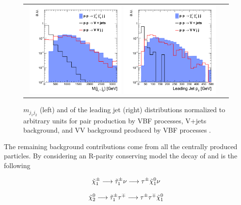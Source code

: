 \begin{figure}[tbh!]
	\centering
	\begin{tabular}{cc}
		\includegraphics[width=0.48\textwidth]{analysis/pics/VBFDiJetMass.png}
		\includegraphics[width=0.48\textwidth]{analysis/pics/VBFFirstLeadingJetPt.png} 		
	\end{tabular}
	\caption{\ensuremath{m_{j_{1}j_{2}}} (left) and \pt of the leading jet (right) distributions normalized to arbitrary units for \charginopm \charginopm pair production by VBF processes, V+jets background, and VV background produced by VBF processes \cite{Dutta:2012xe}.}
	\label{fig:VBF_mjj_ptj1}
\end{figure}


The remaining background contributions come from all the centrally produced particles. By considering an R-parity conserving model the decay of \charginopm and \neutralinotwo is the following

\begin{equation}
 \tilde{\chi}^{\pm}_{1} \longrightarrow \tilde{\tau}_{1}^{\pm} \nu \longrightarrow \tau^{\pm} \tilde{\chi}^{0}_{1} \nu
\end{equation}

\begin{equation}
\tilde{\chi}^{0}_{2} \longrightarrow \tilde{\tau}_{1}^{\pm} \tau^{\mp} \longrightarrow \tau^{\pm} \tau^{\mp} \tilde{\chi}^{0}_{1}
\end{equation}

